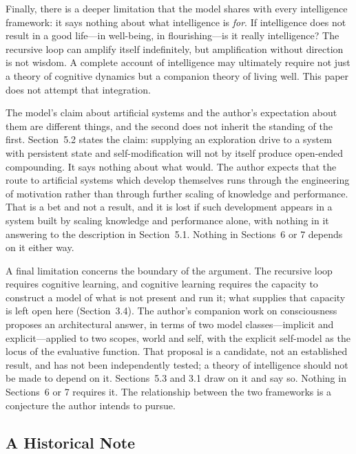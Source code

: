 \documentclass[12pt,a4paper]{article}
\begin{document}
Finally, there is a deeper limitation that the model shares with every intelligence framework: it says nothing about what intelligence is \emph{for}. If intelligence does not result in a good life---\hspace{0pt}in well-being, in flourishing---\hspace{0pt}is it really intelligence? The recursive loop can amplify itself indefinitely, but amplification without direction is not wisdom. A complete account of intelligence may ultimately require not just a theory of cognitive dynamics but a companion theory of living well. This paper does not attempt that integration.

The model's claim about artificial systems and the author's expectation about them are different things, and the second does not inherit the standing of the first. Section~5.2 states the claim: supplying an exploration drive to a system with persistent state and self-modification will not by itself produce open-ended compounding. It says nothing about what would. The author expects that the route to artificial systems which develop themselves runs through the engineering of motivation rather than through further scaling of knowledge and performance. That is a bet and not a result, and it is lost if such development appears in a system built by scaling knowledge and performance alone, with nothing in it answering to the description in Section~5.1. Nothing in Sections~6 or 7 depends on it either way.

A final limitation concerns the boundary of the argument. The recursive loop requires cognitive learning, and cognitive learning requires the capacity to construct a model of what is not present and run it; what supplies that capacity is left open here (Section~3.4). The author's companion work on consciousness \citep{Gruber2026} proposes an architectural answer, in terms of two model classes---\hspace{0pt}implicit and explicit---\hspace{0pt}applied to two scopes, world and self, with the explicit self-model as the locus of the evaluative function. That proposal is a candidate, not an established result, and has not been independently tested; a theory of intelligence should not be made to depend on it. Sections~5.3 and 3.1 draw on it and say so. Nothing in Sections~6 or 7 requires it. The relationship between the two frameworks is a conjecture the author intends to pursue.

\subsection{A Historical Note}
\end{document}
